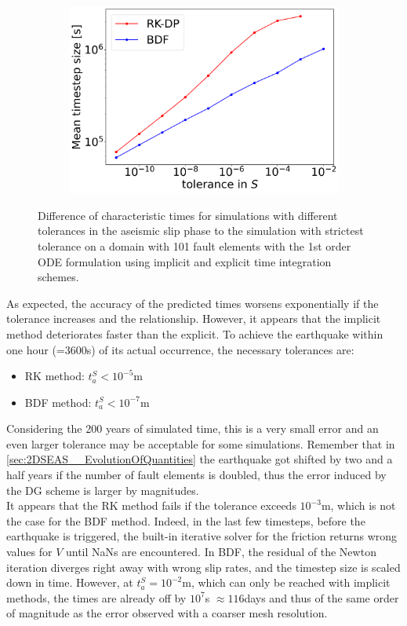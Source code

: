 \begin{figure}[H]
\begin{subfigure}[t]{0.32\textwidth}
		\includegraphics[width=1\textwidth]{images/TANDEMcompactODEDifferentTolerancesSize101_AS_DT.png}
	\end{subfigure}
	\caption{Difference of characteristic times for simulations with different tolerances in the aseismic slip phase to the simulation with strictest tolerance on a domain with 101 fault elements with the 1st order ODE formulation using implicit and explicit time integration schemes.}
	\label{fig:tolerancesAseismicSlip_compactODE}
\end{figure}
As expected, the accuracy of the predicted times worsens exponentially if the tolerance increases and the relationship. However, it appears that the implicit method deteriorates faster than the explicit. To achieve the earthquake within one hour (=3600s) of its actual occurrence, the necessary tolerances are:  
\begin{itemize}
	\item RK method: $t_a^S<10^{-5}$m
	\item BDF method: $t_a^S<10^{-7}$m
\end{itemize}
Considering the 200 years of simulated time, this is a very small error and an even larger tolerance may be acceptable for some simulations. Remember that in \autoref{sec:2DSEAS__EvolutionOfQuantities} the earthquake got shifted by two and a half years if the number of fault elements is doubled, thus the error induced by the DG scheme is larger by magnitudes.  \\
It appears that the RK method fails if the tolerance exceeds $10^{-3}$m, which is not the case for the BDF method. Indeed, in the last few timesteps, before the earthquake is triggered, the built-in iterative solver for the friction returns wrong values for $V$ until NaNs are encountered. In BDF, the residual of the Newton iteration diverges right away with wrong slip rates, and the timestep size is scaled down in time. However, at $t_a^S = 10^{-2}$m, which can only be reached with implicit methods, the times are already off by $10^7$s $\approx 116$days and thus of the same order of magnitude as the error observed with a coarser mesh resolution. \\

